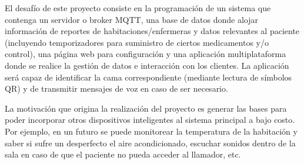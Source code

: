 \documentclass[
11pt, %
]{charter}
\begin{document}
El desafío de este proyecto consiste en la programación de un sistema que contenga un servidor o broker MQTT, una base de datos donde alojar información de reportes de habitaciones/enfermeras y datos relevantes al paciente (incluyendo temporizadores para suministro de ciertos medicamentos y/o control), una página web para configuración y una aplicación multiplataforma donde se realice la gestión de datos e interacción con los clientes. La aplicación será capaz de identificar la cama correspondiente (mediante lectura de símbolos QR) y de transmitir mensajes de voz en caso de ser necesario.

La motivación que origina la realización del proyecto es generar las bases para poder incorporar otros dispositivos inteligentes al sistema principal a bajo costo. Por ejemplo, en un futuro se puede monitorear la temperatura de la habitación y saber si sufre un desperfecto el aire acondicionado, escuchar sonidos dentro de la sala en caso de que el paciente no pueda acceder al llamador, etc.




%
\end{document}
